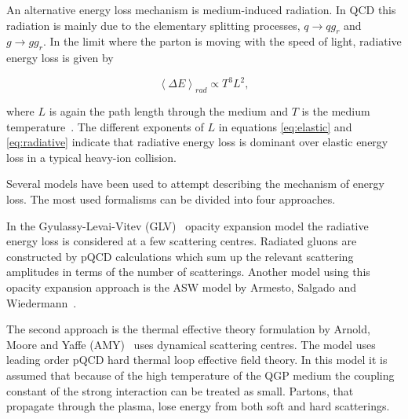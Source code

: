 \noindent An alternative energy loss mechanism is medium-induced radiation. In QCD this radiation is mainly due to the elementary splitting processes, $q\rightarrow qg_r$ and $g\rightarrow gg_r$. In the limit where the parton is moving with the speed of light, radiative energy loss is given by

\begin{equation}
\left<\Delta E\right>_{rad}\propto T^3L^2,
\label{eq:radiative}
\end{equation}

\noindent where $L$ is again the path length through the medium and $T$ is the medium temperature~\cite{Dominguez:2008vd}. The different exponents of $L$ in equations \ref{eq:elastic} and \ref{eq:radiative} indicate that radiative energy loss is dominant over elastic energy loss in a typical heavy-ion collision.

Several models have been used to attempt describing the mechanism of energy loss. The most used formalisms can be divided into four approaches.
%

In the Gyulassy-Levai-Vitev (GLV)~\cite{Gyulassy:1999zd} opacity expansion model the radiative energy loss is considered at a few scattering centres. Radiated gluons are constructed by pQCD calculations which sum up the relevant scattering amplitudes in terms of the number of scatterings. Another model using this opacity expansion approach is the ASW model by Armesto, Salgado and Wiedermann~\cite{Wiedemann:2000za}.

The second approach is the thermal effective theory formulation by Arnold, Moore and Yaffe (AMY)~\cite{Arnold:2001ms} uses dynamical scattering centres. The model uses leading order pQCD hard thermal loop effective field theory. In this model it is assumed that because of the high temperature of the QGP medium the coupling constant of the strong interaction can be treated as small. Partons, that propagate through the plasma, lose energy from both soft and hard scatterings.

